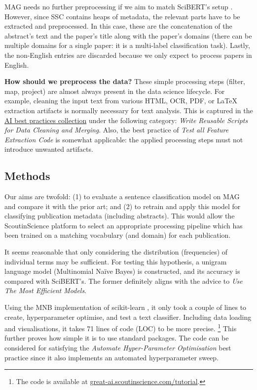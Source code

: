 MAG needs no further preprocessing if we aim to match SciBERT's setup \cite{beltagy2019scibert}. However, since SSC contains heaps of metadata, the relevant parts have to be extracted and preprocessed. In this case, these are the concatenation of the abstract's text and the paper's title along with the paper's domains (there can be multiple domains for a single paper: it is a multi-label classification task). Lastly, the non-English entries are discarded because we only expect to process papers in English.

\begin{displayquote}
\textbf{How should we preprocess the data?} These simple processing steps (filter, map, project) are almost always present in the data science lifecycle. For example, cleaning the input text from various HTML, OCR, PDF, or \LaTeX \hskip 0.12cm extraction artifacts is normally necessary for text analysis. This is captured in the \href{https://se-ml.github.io/practices}{AI best practices collection} under the following category: \textit{Write Reusable Scripts for Data Cleaning and Merging}. Also, the best practice of \textit{Test all Feature Extraction Code} is somewhat applicable: the applied processing steps must not introduce unwanted artifacts.
\end{displayquote}

\subsection{Methods}

Our aims are twofold: (1) to evaluate a sentence classification model on MAG and compare it with the prior art; and (2) to retrain and apply this model for classifying publication metadata (including abstracts). This would allow the ScoutinScience platform to select an appropriate processing pipeline which has been trained on a matching vocabulary (and domain) for each publication. 

It seems reasonable that only considering the distribution (frequencies) of individual terms may be sufficient. For testing this hypothesis, a unigram language model (Multinomial Naïve Bayes) is constructed, and its accuracy is compared with SciBERT's. The former definitely aligns with the advice to \textit{Use The Most Efficient Models}.

Using the MNB implementation of scikit-learn \cite{pedregosa2011scikit}, it only took a couple of lines to create, hyperparameter optimise, and test a text classifier. Including data loading and visualisations, it takes 71 lines of code (LOC) to be more precise. \footnote{The code is available at \href{https://great-ai.scoutinscience.com/tutorial/}{great-ai.scoutinscience.com/tutorial}.} This further proves how simple it is to use standard packages. The code can be considered for satisfying the \textit{Automate Hyper-Parameter Optimisation} best practice since it also implements an automated hyperparameter sweep. 

